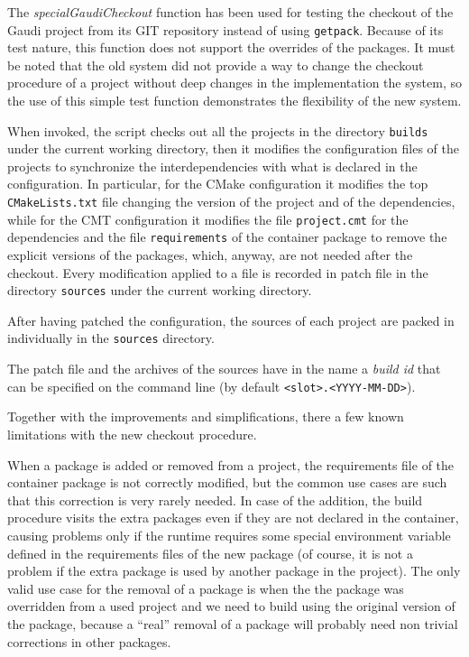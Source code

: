 The \emph{specialGaudiCheckout} function has been used for testing the checkout
of the Gaudi project from its GIT repository instead of using \texttt{getpack}.
Because of its test nature, this function does not support the overrides of the
packages.  It must be noted that the old system did not provide a way to change
the checkout procedure of a project without deep changes in the implementation
the system, so the use of this simple test function demonstrates the flexibility
of the new system.

When invoked, the script checks out all the projects in the directory
\texttt{builds} under the current working directory, then it modifies the
configuration files of the projects to synchronize the interdependencies with
what is declared in the configuration.  In particular, for the CMake
configuration it modifies the top \texttt{CMakeLists.txt} file changing the
version of the project and of the dependencies, while for the CMT configuration
it modifies the file \texttt{project.cmt} for the dependencies and the file
\texttt{requirements} of the container package to remove the explicit versions
of the packages, which, anyway, are not needed after the checkout.  Every
modification applied to a file is recorded in patch file in the directory
\texttt{sources} under the current working directory.

After having patched the configuration, the sources of each project are packed
in individually in the \texttt{sources} directory.

The patch file and the archives of the sources have in the name a \emph{build
id} that can be specified on the command line (by default
\texttt{<slot>.<YYYY-MM-DD>}).

Together with the improvements and simplifications, there a few known
limitations with the new checkout procedure.

When a package is added or removed from a project, the requirements file of the
container package is not correctly modified, but the common use cases are such
that this correction is very rarely needed.  In case of the addition, the build
procedure visits the extra packages even if they are not declared in the
container, causing problems only if the runtime requires some special
environment variable defined in the requirements files of the new package (of
course, it is not a problem if the extra package is used by another package in
the project).  The only valid use case for the removal of a package is when the
the package was overridden from a used project and we need to build using the
original version of the package, because a ``real'' removal of a package will
probably need non trivial corrections in other packages.

